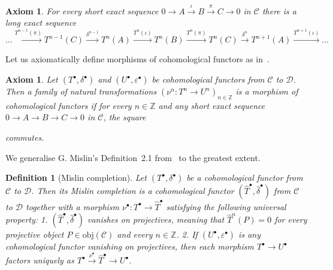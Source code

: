 \documentclass[12pt,a4paper]{article}
\numberwithin{equation}{section}
\newtheorem{defn}[thm]{Definition}
\newtheorem{axm}[thm]{Axiom}
\theoremstyle{nonumberplain}
\begin{document}
\begin{axm}\label{axm:les}
For every short exact sequence $0 \rightarrow A \xrightarrow{\iota} B \xrightarrow{\pi} C \rightarrow 0$ in $\mathcal{C}$ there is a long exact sequence
\[ \dots {} \xrightarrow{T^{n-1}(\pi)} T^{n-1}(C) \xrightarrow{\delta^{n-1}} T^n(A) \xrightarrow{T^n(\iota)} T^n(B) \xrightarrow{T^n(\pi)} T^n(C) \xrightarrow{\delta^n} T^{n+1}(A) \xrightarrow{T^{n+1}(\iota)} {} \dots \]
\end{axm}

Let us axiomatically define morphisms of cohomological functors as in~\cite[p.~202]{kro95}.

\begin{axm}\label{axm:morphisms}
Let $(T^{\bullet}, \delta^{\bullet})$ and $(U^{\bullet},\varepsilon^{\bullet})$ be cohomological functors from $\mathcal{C}$ to $\mathcal{D}$. Then a family of natural transformations $(\nu^n: T^n \rightarrow U^n)_{n \in \mathbb{Z}}$ is a morphism of cohomological functors if for every $n \in \mathbb{Z}$ and any short exact sequence $0 \rightarrow A \rightarrow B \rightarrow C \rightarrow 0$ in $\mathcal{C}$, the square
\begin{center}
\end{center}
commutes.
\end{axm}

We generalise G.\! Mislin's Definition~2.1 from~\cite{mis94} to the greatest extent.

\begin{defn}[Mislin completion]\label{defn:mislincompletion}
Let $(T^{\bullet}, \delta^{\bullet})$ be a cohomological functor from $\mathcal{C}$ to $\mathcal{D}$. Then its Mislin completion is a cohomological functor $(\widehat{T}^{\bullet}, \widehat{\delta}^{\bullet})$ from $\mathcal{C}$ to $\mathcal{D}$ together with a morphism $\nu^{\bullet}: T^{\bullet} \rightarrow \widehat{T}^{\bullet}$ satisfying the following universal property: \newline
\textnormal{1.} $(\widehat{T}^{\bullet}, \widehat{\delta}^{\bullet})$ vanishes on projectives, meaning that $\widehat{T}^n(P) = 0$ for every projective object $P \in \mathrm{obj}(\mathcal{C})$ and every $n \in \mathbb{Z}$. \newline
\textnormal{2.} If $(U^{\bullet}, \varepsilon^{\bullet})$ is any cohomological functor vanishing on projectives, then each morphism $T^{\bullet} \rightarrow U^{\bullet}$ factors uniquely as $T^{\bullet} \xrightarrow{\nu^{\bullet}} \widehat{T}^{\bullet} \rightarrow U^{\bullet}$.
\end{defn}
\end{document}
